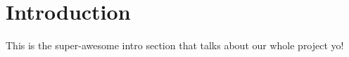 \section{Introduction}
This is the super-awesome intro section that talks about our
whole project yo!


